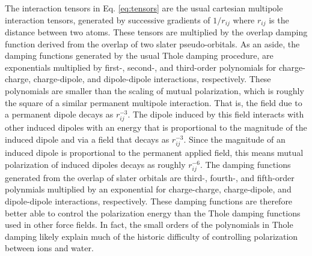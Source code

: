 \documentclass[journal=jacsat,manuscript=article]{achemso}
\begin{document}
The interaction tensors in Eq. \ref{eq:tensors} are the usual cartesian multipole interaction tensors, generated by successive gradients of $1/r_{ij}$ where $r_{ij}$ is the distance between two atoms. These tensors are multiplied by the overlap damping function derived from the overlap of two slater pseudo-orbitals\cite{rackers2021polarizable}. As an aside, the damping functions generated by the usual Thole damping procedure\cite{thole1981molecular}, are exponentials multiplied by first-, second-, and third-order polynomials for charge-charge, charge-dipole, and dipole-dipole interactions, respectively.\cite{thole1981molecular} These polynomials are smaller than the scaling of mutual polarization, which is roughly the square of a similar permanent multipole interaction. That is, the field due to a permanent dipole decays as $r_{ij}^{-3}$. The dipole induced by this field interacts with other induced dipoles with an energy that is proportional to the magnitude of the induced dipole and via a field that decays as $r_{ij}^{-3}$. Since the magnitude of an induced dipole is proportional to the permanent applied field, this means mutual polarization of induced dipoles decays as roughly $r_{ij}^{-6}$. The damping functions generated from the overlap of slater orbitals are third-, fourth-, and fifth-order polynmials multiplied by an exponential for charge-charge, charge-dipole, and dipole-dipole interactions, respectively. These damping functions are therefore better able to control the polarization energy than the Thole damping functions used in other force fields. In fact, the small orders of the polynomials in Thole damping likely explain much of the historic difficulty of controlling polarization between ions and water.\cite{jiao2006simulation,mason2012accurate}
\end{document}
